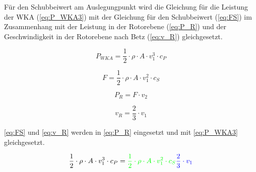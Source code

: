 Für den Schubbeiwert am Auslegungpunkt wird die Gleichung für die Leistung der WKA (\autoref{eq:P_WKA3}) mit der Gleichung für den Schubbeiwert (\autoref{eq:FS}) im Zusammenhang mit der Leistung in der Rotorebene (\autoref{eq:P_R})  und der Geschwindigkeit in der Rotorebene nach Betz (\autoref{eq:v_R}) gleichgesetzt. 

\begin{equation}
P_{WKA}= \frac{1}{2} \cdot \rho \cdot A \cdot v_1^3  \cdot c_P
\label{eq:P_WKA3} 
\end{equation}

\color{green}{}
\begin{equation}
F= \frac{1}{2} \cdot \rho \cdot A \cdot v_1^2  \cdot c_S
\label{eq:FS} 
\end{equation}
\color{black}{}


\begin{equation}
P_R= F \cdot v_2 
\label{eq:P_R} 
\end{equation}

\color{blue}{}
\begin{equation}
v_R= \frac{2}{3} \cdot v_1
\label{eq:v_R} 
\end{equation}
\color{black}{}


\autoref{eq:FS} und \autoref{eq:v_R} werden in \autoref{eq:P_R} eingesetzt und mit \autoref{eq:P_WKA3} gleichgesetzt. 

\begin{equation}
\frac{1}{2} \cdot \rho \cdot A \cdot v_1^3 \cdot c_P = \color{green}{}\frac{1}{2} \cdot \rho \cdot A \cdot v_1^2  \cdot c_S \color{blue}{}\frac{2}{3} \cdot v_1 \color{black}{}
\label{eq:c_s1} 
\end{equation}



\label{sec:Vorbereitungsfragen}
